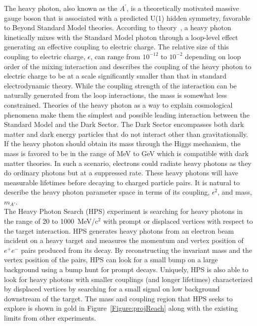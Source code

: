 The heavy photon, also known as the $A^{\prime}$, is a theoretically motivated massive gauge boson that is associated with a predicted U(1) hidden symmetry, favorable to Beyond Standard Model theories. According to theory~\cite{holdom_two_1986}, a heavy photon kinetically mixes with the Standard Model photon through a loop-level effect generating an effective coupling to electric charge. The relative size of this coupling to electric charge, $\epsilon$, can range from $10^{-12}$ to $10^{-2}$ depending on loop order of the mixing interaction and describes the coupling of the heavy photon to electric charge to be at a scale significantly smaller than that in standard electrodynamic theory. While the coupling strength of the interaction can be naturally generated from the loop interactions, the mass is somewhat less constrained. Theories of the heavy photon as a way to explain cosmological phenomena make them the simplest and possible leading interaction between the Standard Model and the Dark Sector. The Dark Sector encompasses both dark matter and dark energy particles that do not interact other than gravitationally. If the heavy photon should obtain its mass through the Higgs mechanism, the mass is favored to be in the range of MeV to GeV which is compatible with dark matter theories. In such a scenario, electrons could radiate heavy photons as they do ordinary photons but at a suppressed rate. These heavy photons will have measurable lifetimes before decaying to charged particle pairs. It is natural to describe the heavy photon parameter space in terms of its coupling, $\epsilon^2$, and mass, $m_{A'}$. \\
\indent The Heavy Photon Search (HPS) experiment is searching for heavy photons in the range of 20 to 1000~MeV/c$^2$ with prompt or displaced vertices with respect to the target interaction. HPS  generates heavy photons from an electron beam incident on a heavy target and measures the momentum and vertex position of $e^+e^-$ pairs produced from its decay. By reconstructing the invariant mass and the vertex position of the pairs, HPS can look for a small bump on a large background using a bump hunt for prompt decays. Uniquely, HPS is also able to look for heavy photons with smaller couplings (and longer lifetimes) characterized by displaced vertices by searching for a small signal on low background downstream of the target. The mass and coupling region that HPS seeks to explore is shown in gold in Figure~\ref{Figure:projReach} along with the existing limits from other experiments. 

